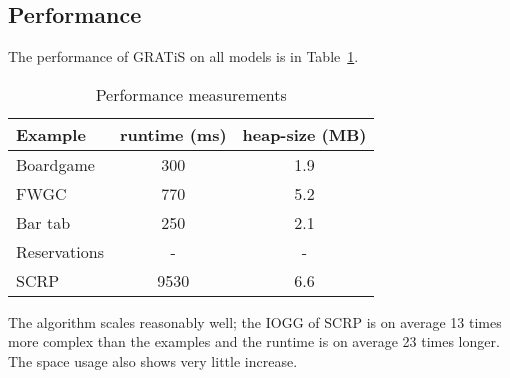 \subsection{Performance}
The performance of GRATiS on all models is in Table~\ref{tab:performance}.

\begin{table}[ht]
\begin{center}
\begin{tabular}{|l|c|c|}
\hline
\textbf{Example} & \textbf{runtime (ms)} & \textbf{heap-size (MB)} \\ \hline
Boardgame & 300 & 1.9 \\ \hline
FWGC & 770 & 5.2 \\ \hline
Bar tab & 250 & 2.1 \\ \hline
Reservations & - & - \\ \hline
SCRP & 9530 & 6.6 \\ \hline
\end{tabular}
\end{center}
\caption{Performance measurements}
\label{tab:performance}
\end{table}

The algorithm scales reasonably well; the IOGG of SCRP is on average 13 times more complex than the examples and the runtime is on average 23 times longer. The space usage also shows very little increase.